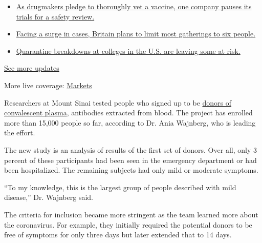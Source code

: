 \begin{itemize}
\tightlist
\item
  \href{https://www.nytimes3xbfgragh.onion/2020/09/09/world/covid-19-coronavirus.html?action=click\&pgtype=Article\&state=default\&region=MAIN_CONTENT_1\&context=storylines_live_updates\#link-70cea8bb}{As
  drugmakers pledge to thoroughly vet a vaccine, one company pauses its
  trials for a safety review.}
\item
  \href{https://www.nytimes3xbfgragh.onion/2020/09/09/world/covid-19-coronavirus.html?action=click\&pgtype=Article\&state=default\&region=MAIN_CONTENT_1\&context=storylines_live_updates\#link-4438dd7}{Facing
  a surge in cases, Britain plans to limit most gatherings to six
  people.}
\item
  \href{https://www.nytimes3xbfgragh.onion/2020/09/09/world/covid-19-coronavirus.html?action=click\&pgtype=Article\&state=default\&region=MAIN_CONTENT_1\&context=storylines_live_updates\#link-11cec4c0}{Quarantine
  breakdowns at colleges in the U.S. are leaving some at risk.}
\end{itemize}

\href{https://www.nytimes3xbfgragh.onion/2020/09/09/world/covid-19-coronavirus.html?action=click\&pgtype=Article\&state=default\&region=MAIN_CONTENT_1\&context=storylines_live_updates}{See
more updates}

More live coverage:
\href{https://www.nytimes3xbfgragh.onion/live/2020/09/08/business/stock-market-today-coronavirus?action=click\&pgtype=Article\&state=default\&region=MAIN_CONTENT_1\&context=storylines_live_updates}{Markets}

Researchers at Mount Sinai tested people who signed up to be
\href{https://www.nytimes3xbfgragh.onion/2020/03/26/health/plasma-coronavirus-treatment.html}{donors
of convalescent plasma}, antibodies extracted from blood. The project
has enrolled more than 15,000 people so far, according to Dr. Ania
Wajnberg, who is leading the effort.

The new study is an analysis of results of the first set of donors. Over
all, only 3 percent of these participants had been seen in the emergency
department or had been hospitalized. The remaining subjects had only
mild or moderate symptoms.

``To my knowledge, this is the largest group of people described with
mild disease,'' Dr. Wajnberg said.

The criteria for inclusion became more stringent as the team learned
more about the coronavirus. For example, they initially required the
potential donors to be free of symptoms for only three days but later
extended that to 14 days.

